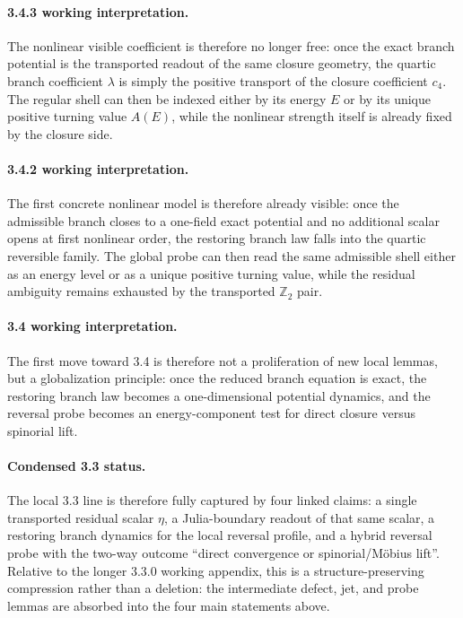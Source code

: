 \paragraph{3.4.3 working interpretation.}
The nonlinear visible coefficient is therefore no longer free: once the exact branch potential is the transported readout of the same closure geometry, the quartic branch coefficient $\lambda$ is simply the positive transport of the closure coefficient $c_4$. The regular shell can then be indexed either by its energy $E$ or by its unique positive turning value $A(E)$, while the nonlinear strength itself is already fixed by the closure side.

\paragraph{3.4.2 working interpretation.}
The first concrete nonlinear model is therefore already visible: once the admissible branch closes to a one-field exact potential and no additional scalar opens at first nonlinear order, the restoring branch law falls into the quartic reversible family. The global probe can then read the same admissible shell either as an energy level or as a unique positive turning value, while the residual ambiguity remains exhausted by the transported $\mathbb Z_2$ pair.

\paragraph{3.4 working interpretation.}
The first move toward 3.4 is therefore not a proliferation of new local lemmas, but a globalization principle: once the reduced branch equation is exact, the restoring branch law becomes a one-dimensional potential dynamics, and the reversal probe becomes an energy-component test for direct closure versus spinorial lift.

\paragraph{Condensed 3.3 status.}
The local 3.3 line is therefore fully captured by four linked claims: a single transported residual scalar $\eta$, a Julia-boundary readout of that same scalar, a restoring branch dynamics for the local reversal profile, and a hybrid reversal probe with the two-way outcome ``direct convergence or spinorial/M\"obius lift''. Relative to the longer 3.3.0 working appendix, this is a structure-preserving compression rather than a deletion: the intermediate defect, jet, and probe lemmas are absorbed into the four main statements above.

